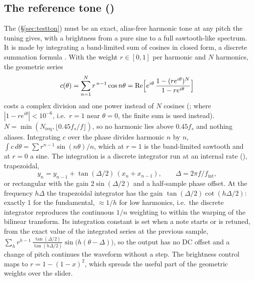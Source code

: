 \subsection{The reference tone ()}
\label{sec:math-dsf}
The  (\S\ref{sec:testton}) must be an exact, alias-free harmonic tone at any pitch the tuning gives, with a
brightness from a pure sine to a full sawtooth-like spectrum. It is made by integrating a band-limited sum of cosines in
closed form, a discrete summation formula \citep{moorer1976dsf}. With the weight $r\in[0,1]$ per harmonic and $N$
harmonics, the geometric series
\begin{equation}
  c(\theta) = \sum_{n=1}^{N} r^{\,n-1}\cos n\theta
  = \operatorname{Re}\Bigl[e^{i\theta}\,\frac{1-(re^{i\theta})^N}{1-re^{i\theta}}\Bigr]
\end{equation}
costs a complex division and one power instead of $N$ cosines (; where $|1-re^{i\theta}|<10^{-6}$, i.e.\
$r=1$ near $\theta=0$, the finite sum is used instead). $N = \min(N_\mathrm{req}, \lfloor 0.45f_s/f\rfloor)$, so no
harmonic lies above $0.45f_s$ and nothing aliases. Integrating $c$ over the phase divides harmonic $n$ by $n$,
$\int c\,d\theta = \sum r^{n-1}\sin(n\theta)/n$, which at $r=1$ is the band-limited sawtooth and at $r=0$ a sine. The
integration is a discrete integrator run at an internal rate (\fn{DsfIntegrator}), trapezoidal,
\begin{equation}
  y_n = y_{n-1} + \tan(\Delta/2)\,(x_n + x_{n-1}),\qquad \Delta = 2\pi f/f_\mathrm{int},
\end{equation}
or rectangular with the gain $2\sin(\Delta/2)$ and a half-sample phase offset. At the frequency $h\Delta$ the trapezoidal
integrator has the gain $\tan(\Delta/2)\cot(h\Delta/2)$: exactly 1 for the fundamental, $\approx 1/h$ for low harmonics,
i.e.\ the discrete integrator reproduces the continuous $1/n$ weighting to within the warping of the bilinear
transform. Its integration constant is set when a note starts or is retuned, from the exact value of the integrated
series at the previous sample, $\sum_h r^{h-1}\,\frac{\tan(\Delta/2)}{\tan(h\Delta/2)}\sin\bigl(h(\theta-\Delta)\bigr)$, so the
output has no DC offset and a change of pitch continues the waveform without a step. The brightness control maps to
$r = 1-(1-x)^2$, which spreads the useful part of the geometric weights over the slider.

